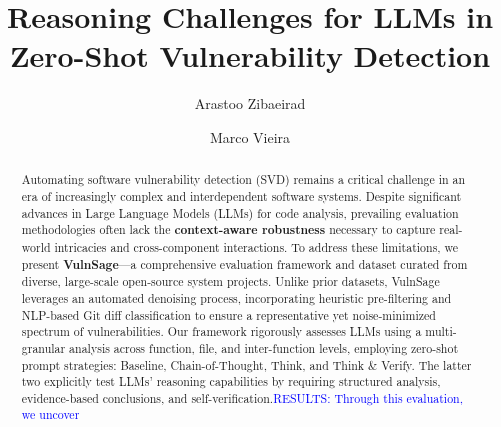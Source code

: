 \documentclass[sigconf,review,anonymous]{acmart}
\begin{document}
\title{Reasoning Challenges for LLMs in Zero-Shot Vulnerability Detection}

\author{Arastoo Zibaeirad}

\author{Marco Vieira}

\begin{abstract}
Automating software vulnerability detection (SVD) remains a critical challenge in an era of increasingly complex and interdependent software systems. Despite significant advances in Large Language Models (LLMs) for code analysis, prevailing evaluation methodologies often lack the \textbf{context-aware robustness} necessary to capture real-world intricacies and cross-component interactions. To address these limitations, we present \textbf{VulnSage}—a comprehensive evaluation framework and dataset curated from diverse, large-scale open-source system projects. Unlike prior datasets, VulnSage leverages an automated denoising process, incorporating heuristic pre-filtering and NLP-based Git diff classification to ensure a representative yet noise-minimized spectrum of vulnerabilities. Our framework rigorously assesses LLMs using a multi-granular analysis across function, file, and inter-function levels, employing zero-shot prompt strategies: Baseline, Chain-of-Thought, Think, and Think \& Verify. The latter two explicitly test LLMs' reasoning capabilities by requiring structured analysis, evidence-based conclusions, and self-verification.\textcolor{blue}{RESULTS: Through this evaluation, we uncover}
\end{abstract}




\maketitle
\end{document}
